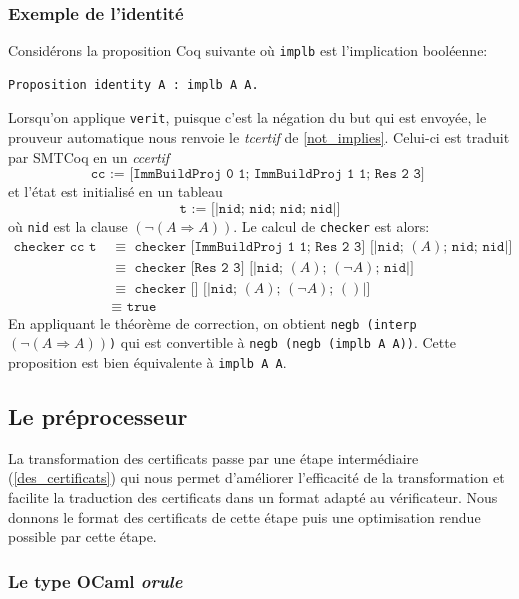 \documentclass[11pt]{article}
\begin{document}
\subsubsection{Exemple de l'identité} \label{id_exemple}

Considérons la proposition Coq suivante où \texttt{implb} est l'implication booléenne:
\begin{lstlisting}[frame=single]
  Proposition identity A : implb A A.
\end{lstlisting}

Lorsqu'on applique \texttt{verit}, puisque c'est la négation du but qui est envoyée, le prouveur automatique nous renvoie le \textit{tcertif} de \ref{not_implies}. Celui-ci est traduit par SMTCoq en un \textit{ccertif}
\[ \texttt{cc := [ImmBuildProj 0 1; ImmBuildProj 1 1; Res 2 3] } \]
et l'état est initialisé en un tableau 
\[\texttt{t := [|nid; nid; nid; nid|]}\] 
où \texttt{nid} est la clause $(\neg (A \Rightarrow A))$.
Le calcul de \texttt{checker} est alors:
\begin{align*}
  \texttt{checker cc t}\,\, &\equiv \,\, \texttt{checker [ImmBuildProj 1 1; Res 2 3] [|nid; }(A)\texttt{; nid; nid|]} \\
    &\equiv \,\, \texttt{checker [Res 2 3] [|nid; }(A)\texttt{; }(\neg A)\texttt{; nid|]} \\
    &\equiv \,\, \texttt{checker [] [|nid; }(A)\texttt{; }(\neg A)\texttt{; }()\texttt{|]} \\
    &\equiv \,\, \texttt{true}
\end{align*}
En appliquant le théorème de correction, on obtient \texttt{negb (interp }$(\neg (A \Rightarrow A))$\texttt{)} qui est convertible à \texttt{negb (negb (implb A A))}. Cette proposition est bien équivalente à \texttt{implb A A}.

\subsection{Le préprocesseur}

La transformation des certificats passe par une étape intermédiaire (\ref{des_certificats}) qui nous permet d'améliorer l'efficacité de la transformation et facilite la traduction des certificats dans un format adapté au vérificateur. Nous donnons le format des certificats de cette étape puis une optimisation rendue possible par cette étape.

\subsubsection{Le type OCaml \textit{orule}}
\end{document}
